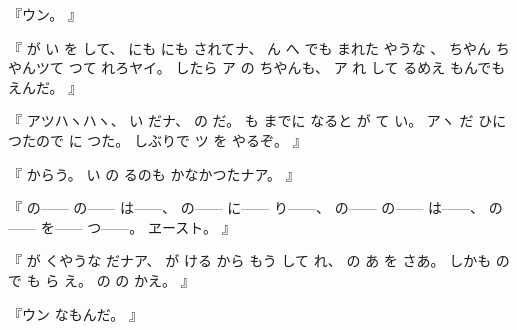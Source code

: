 %
『ウン。
』

%
『
が
い
を
して、
%
にも
にも
されてナ、
%
ん
へ
でも
まれた
やうな
、
%
ちやん
ちやんツて
つて
れろヤイ。
%
したら
ア
の
ちやんも、
%
ア
れ
して
るめえ
もんでも
えんだ。
』

%
『
アツハヽハヽ、
%
い
だナ、
%
の
だ。
%
も
までに
なると
が
て
い。
%
アヽ
だ
ひに
つたので
に
つた。%
%
しぶりで
ツ
を
やるぞ。
』

%
『
からう。
%
い
の
るのも
かなかつたナア。
』

%
『
の{---}{---}
の{---}{---}
は{---}{---}、
%
の{---}{---}
に{---}{---}
り{---}{---}、
%
の{---}{---}
の{---}{---}
は{---}{---}、
%
の{---}{---}
を{---}{---}
つ{---}{---}。
%
ヱースト。
』

%
『
が
くやうな
だナア、
%
が
ける
から
もう
して%
れ、
%
の%
あ
を
さあ。
%
しかも
の
で
も
ら
え。
%
の
の
かえ。
』

%
『ウン
なもんだ。
』

